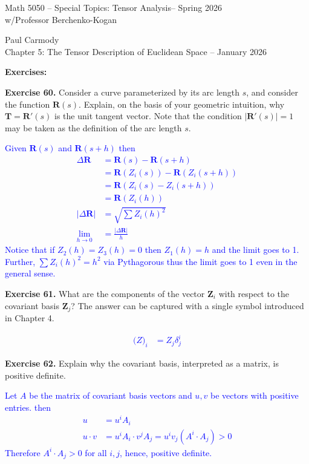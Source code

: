 \documentclass[12pt,a4paper]{report}
\newcommand{\CLASSNAME}{Math 5050 -- Special Topics: Tensor Analysis}
\newcommand{\STUDENTNAME}{Paul Carmody}
\newcommand{\ASSIGNMENT}{Chapter 5: The Tensor Description of Euclidean Space }
\newcommand{\DUEDATE}{January 2026}
\newcommand{\PROFESSOR}{Professor Berchenko-Kogan}
\newcommand{\SEMESTER}{Spring 2026}
\newcommand{\BLUE}[1]{\textcolor{blue}{#1}}
\newcommand{\VK}[1]{\textbf{#1}}
\newcommand{\VKR}{\VK{R}}
\begin{document}
\begin{center}
	\Large{\CLASSNAME -- \SEMESTER} \\
	\large{ w/\PROFESSOR}
\end{center}
\begin{center}
	\STUDENTNAME \\
	\ASSIGNMENT -- \DUEDATE\\
\end{center} 

\noindent\textbf{Exercises:}
\begin{description}

\item \textbf{Exercise 60.}  Consider a curve parameterized by its arc length $s$, and consider the function $\VK{R}(s)$.  Explain, on the basis of your geometric intuition, why $\VK{T}=\VK{R}'(s)$ is the unit tangent vector.  Note that the condition $|\VK{R}'(s)| = 1$ may be taken as the definition of the arc length $s$.

\BLUE{Given $\VKR(s)$ and $\VKR(s+h)$ then 
\begin{align*}
	\Delta \VKR &= \VKR(s)-\VKR(s+h) \\
	&= \VKR(Z_i(s)) - \VKR(Z_i(s+h))\\
	&= \VKR(Z_i(s) - Z_i(s+h))\\
	&= \VKR(Z_i(h)) \\
	|\Delta \VKR| &= \sqrt{\sum Z_i(h)^2} \\
	\lim_{h\to 0} &= \frac{|\Delta\VKR|}{h}
\end{align*}Notice that if $Z_2(h)=Z_3(h) = 0$ then $Z_1(h) = h$ and the limit goes to 1.  Further, $\sum Z_i(h)^2 = h^2$ via Pythagorous thus the limit goes to 1 even in the general sense.
}

\item \textbf{Exercise 61.}  What are the components of the vector $\VK{Z}_i$ with respect to the covariant basis $\VK{Z}_j$?  The answer can be captured with a single symbol introduced in Chapter 4.

\BLUE{\begin{align*}
	\VK(Z)_i &= Z_j \delta^i_j 
\end{align*}
}

\item \textbf{Exercise 62.}  Explain why the covariant basis, interpreted as a matrix, is positive definite.

\BLUE{Let $A$ be the matrix of covariant basis vectors and $u, v$ be vectors with positive entries.  then
\begin{align*}
	u &= u^iA_i  \\
	u \cdot v &= u^iA_i \cdot v^jA_j = u^iv_j(A^i\cdot A_j) > 0
\end{align*}Therefore $A^i\cdot A_j >0$ for all $i,j$, hence, positive definite.
}


\end{description}
\end{document}
